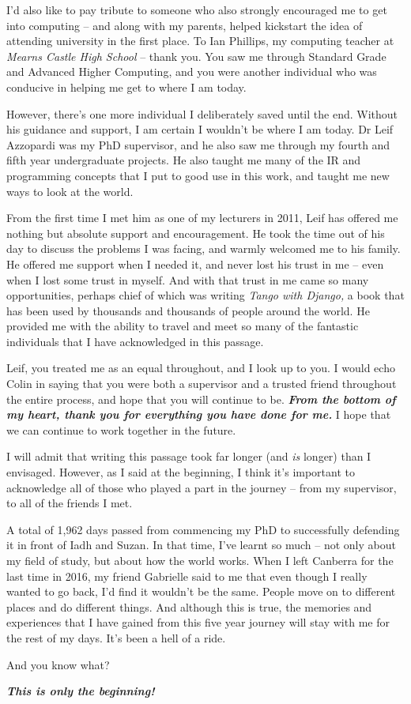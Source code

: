 \begin{preamble}
I'd also like to pay tribute to someone who also strongly encouraged me to get into computing -- and along with my parents, helped kickstart the idea of attending university in the first place. To Ian Phillips, my computing teacher at \emph{Mearns Castle High School} -- thank you. You saw me through Standard Grade and Advanced Higher Computing, and you were another individual who was conducive in helping me get to where I am today.

However, there's one more individual I deliberately saved until the end. Without his guidance and support, I am certain I wouldn't be where I am today. Dr Leif Azzopardi was my PhD supervisor, and he also saw me through my fourth and fifth year undergraduate projects. He also taught me many of the IR and programming concepts that I put to good use in this work, and taught me new ways to look at the world.

From the first time I met him as one of my lecturers in 2011, Leif has offered me nothing but absolute support and encouragement. He took the time out of his day to discuss the problems I was facing, and warmly welcomed me to his family. He offered me support when I needed it, and never lost his trust in me -- even when I lost some trust in myself. And with that trust in me came so many opportunities, perhaps chief of which was writing \emph{Tango with Django,} a book that has been used by thousands and thousands of people around the world. He provided me with the ability to travel and meet so many of the fantastic individuals that I have acknowledged in this passage.

Leif, you treated me as an equal throughout, and I look up to you. I would echo Colin in saying that you were both a supervisor and a trusted friend throughout the entire process, and hope that you will continue to be. \textbf{\emph{From the bottom of my heart, thank you for everything you have done for me.}} I hope that we can continue to work together in the future.

\acksep

I will admit that writing this passage took far longer (and \emph{is} longer) than I envisaged. However, as I said at the beginning, I think it's important to acknowledge all of those who played a part in the journey -- from my supervisor, to all of the friends I met.

A total of 1,962 days passed from commencing my PhD to successfully defending it in front of Iadh and Suzan. In that time, I've learnt so much -- not only about my field of study, but about how the world works. When I left Canberra for the last time in 2016, my friend Gabrielle said to me that even though I really wanted to go back, I'd find it wouldn't be the same. People move on to different places and do different things. And although this is true, the memories and experiences that I have gained from this five year journey will stay with me for the rest of my days. It's been a hell of a ride.

And you know what?

\textbf{\emph{This is only the beginning!}}~
\end{preamble}